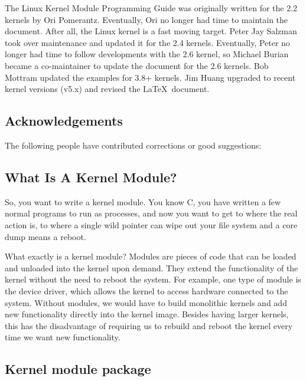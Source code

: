 \documentclass[10pt, oneside]{book}
\begin{document}
The Linux Kernel Module Programming Guide was originally written for the 2.2 kernels by Ori Pomerantz.
Eventually, Ori no longer had time to maintain the document.
After all, the Linux kernel is a fast moving target.
Peter Jay Salzman took over maintenance and updated it for the 2.4 kernels.
Eventually, Peter no longer had time to follow developments with the 2.6 kernel, so Michael Burian became a co-maintainer to update the document for the 2.6 kernels.
Bob Mottram updated the examples for 3.8+ kernels.
Jim Huang upgraded to recent kernel versions (v5.x) and revised the \LaTeX\ document.

\subsection{Acknowledgements}
\label{sec:acknowledgements}

The following people have contributed corrections or good suggestions: 

\begin{flushleft}

\end{flushleft}

\subsection{What Is A Kernel Module?}
\label{sec:kernelmod}

So, you want to write a kernel module.
You know C, you have written a few normal programs to run as processes, and now you want to get to where the real action is, to where a single wild pointer can wipe out your file system and a core dump means a reboot.

What exactly is a kernel module?
Modules are pieces of code that can be loaded and unloaded into the kernel upon demand.
They extend the functionality of the kernel without the need to reboot the system.
For example, one type of module is the device driver, which allows the kernel to access hardware connected to the system.
Without modules, we would have to build monolithic kernels and add new functionality directly into the kernel image.
Besides having larger kernels, this has the disadvantage of requiring us to rebuild and reboot the kernel every time we want new functionality.

\subsection{Kernel module package}
\label{sec:packages}
\end{document}
